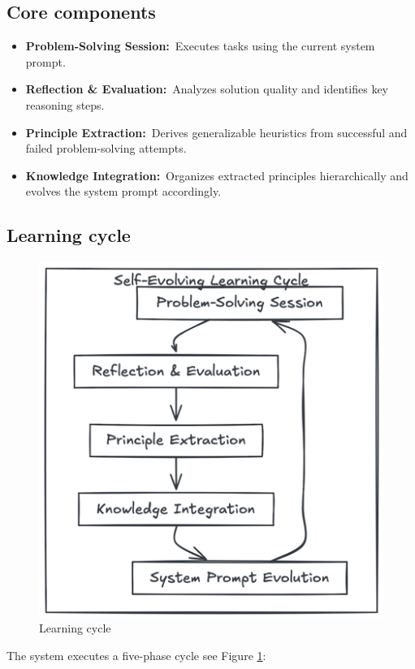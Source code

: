 \documentclass[10pt,a4paper,twocolumn]{article}
\begin{document}
\subsection{Core components}


\begin{itemize}
    \item \textbf{Problem-Solving Session:} Executes tasks using the current system prompt.
    \item \textbf{Reflection \& Evaluation:} Analyzes solution quality and identifies key reasoning steps.
    \item \textbf{Principle Extraction:} Derives generalizable heuristics from successful and failed problem-solving attempts.
    \item \textbf{Knowledge Integration:} Organizes extracted principles hierarchically and evolves the system prompt accordingly.
\end{itemize}



\subsection{Learning cycle}

\begin{figure}
    \centering
    \includegraphics[width=0.75\linewidth]{learning_cycle.png}
    \caption{Learning cycle}
    \label{fig:cycle}
\end{figure}




 The system executes a five-phase cycle see Figure \ref{fig:cycle}:
\end{document}

